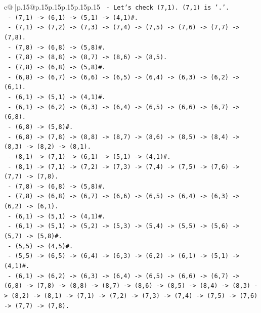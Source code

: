 \documentclass{article}
\begin{document}
{\begin{supertabular}{c@{$\;$}|p{.15\linewidth}@{}p{.15\linewidth}p{.15\linewidth}p{.15\linewidth}p{.15\linewidth}p{.15\linewidth}}
{{{\texttt{        {-} Let's check (7,1). (7,1) is '.'.} \\
\texttt{        {-} (7,1) {-}> (6,1) {-}> (5,1) {-}> (4,1)\#.} \\
\texttt{        {-} (7,1) {-}> (7,2) {-}> (7,3) {-}> (7,4) {-}> (7,5) {-}> (7,6) {-}> (7,7) {-}> (7,8).} \\
\texttt{        {-} (7,8) {-}> (6,8) {-}> (5,8)\#.} \\
\texttt{        {-} (7,8) {-}> (8,8) {-}> (8,7) {-}> (8,6) {-}> (8,5).} \\
\texttt{        {-} (7,8) {-}> (6,8) {-}> (5,8)\#.} \\
\texttt{        {-} (6,8) {-}> (6,7) {-}> (6,6) {-}> (6,5) {-}> (6,4) {-}> (6,3) {-}> (6,2) {-}> (6,1).} \\
\texttt{        {-} (6,1) {-}> (5,1) {-}> (4,1)\#.} \\
\texttt{        {-} (6,1) {-}> (6,2) {-}> (6,3) {-}> (6,4) {-}> (6,5) {-}> (6,6) {-}> (6,7) {-}> (6,8).} \\
\texttt{        {-} (6,8) {-}> (5,8)\#.} \\
\texttt{        {-} (6,8) {-}> (7,8) {-}> (8,8) {-}> (8,7) {-}> (8,6) {-}> (8,5) {-}> (8,4) {-}> (8,3) {-}> (8,2) {-}> (8,1).} \\
\texttt{        {-} (8,1) {-}> (7,1) {-}> (6,1) {-}> (5,1) {-}> (4,1)\#.} \\
\texttt{        {-} (8,1) {-}> (7,1) {-}> (7,2) {-}> (7,3) {-}> (7,4) {-}> (7,5) {-}> (7,6) {-}> (7,7) {-}> (7,8).} \\
\texttt{        {-} (7,8) {-}> (6,8) {-}> (5,8)\#.} \\
\texttt{        {-} (7,8) {-}> (6,8) {-}> (6,7) {-}> (6,6) {-}> (6,5) {-}> (6,4) {-}> (6,3) {-}> (6,2) {-}> (6,1).} \\
\texttt{        {-} (6,1) {-}> (5,1) {-}> (4,1)\#.} \\
\texttt{        {-} (6,1) {-}> (5,1) {-}> (5,2) {-}> (5,3) {-}> (5,4) {-}> (5,5) {-}> (5,6) {-}> (5,7) {-}> (5,8)\#.} \\
\texttt{        {-} (5,5) {-}> (4,5)\#.} \\
\texttt{        {-} (5,5) {-}> (6,5) {-}> (6,4) {-}> (6,3) {-}> (6,2) {-}> (6,1) {-}> (5,1) {-}> (4,1)\#.} \\
\texttt{        {-} (6,1) {-}> (6,2) {-}> (6,3) {-}> (6,4) {-}> (6,5) {-}> (6,6) {-}> (6,7) {-}> (6,8) {-}> (7,8) {-}> (8,8) {-}> (8,7) {-}> (8,6) {-}> (8,5) {-}> (8,4) {-}> (8,3) {-}> (8,2) {-}> (8,1) {-}> (7,1) {-}> (7,2) {-}> (7,3) {-}> (7,4) {-}> (7,5) {-}> (7,6) {-}> (7,7) {-}> (7,8).} \\
}}}
\end{supertabular}}
\end{document}
